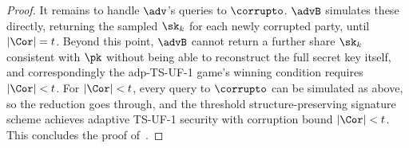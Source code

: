 \begin{proof}
It remains to handle $\adv$'s queries to $\corrupto$. $\advB$ simulates these
directly, returning the sampled $\sk_k$ for each newly corrupted party, until
$|\Cor| = t$. Beyond this point, $\advB$ cannot return a further share $\sk_k$
consistent with $\pk$ without being able to reconstruct the full secret key
itself, and correspondingly the adp-TS-UF-1 game's winning condition requires
$|\Cor| < t$. For $|\Cor| < t$, every query to $\corrupto$ can be simulated as
above, so the reduction goes through, and the threshold structure-preserving
signature scheme achieves adaptive TS-UF-1 security with corruption bound
$|\Cor| < t$. This concludes the proof of~.

\end{proof}
